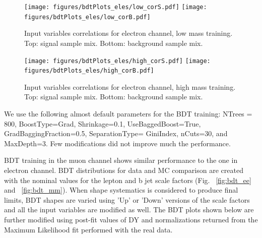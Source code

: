 \begin{figure}[tbp]
  \begin{center}
   \texttt{[image: figures/bdtPlots\_eles/low\_corS.pdf]}
   \texttt{[image: figures/bdtPlots\_eles/low\_corB.pdf]}
    \caption{ Input variables correlations for electron channel, low mass training. Top: signal sample mix. Bottom: background sample mix. }
    \label{fig:ele_cors_low}
  \end{center}
\end{figure}


\begin{figure}[tbp]
  \begin{center}
   \texttt{[image: figures/bdtPlots\_eles/high\_corS.pdf]}
   \texttt{[image: figures/bdtPlots\_eles/high\_corB.pdf]}
    \caption{ Input variables correlations for electron channel, high mass training. Top: signal sample mix. Bottom: background sample mix. }
    \label{fig:ele_cors_high}
  \end{center}
\end{figure}


We use the following almost default parameters for the BDT training:
NTrees = 800, BoostType=Grad, Shrinkage=0.1, UseBaggedBoost=True,
GradBaggingFraction=0.5, SeparationType= GiniIndex, nCuts=30, and
MaxDepth=3. Few modifications did not improve much the performance.


BDT training in the muon channel shows similar performance to the one in electron channel.
BDT distributions for data and MC comparison are created with the nominal values for the lepton and b jet scale factors (Fig. ~\ref{fig:bdt_ee} and ~\ref{fig:bdt_mm}). When shape systematics is considered to produce final limits, BDT shapes are
varied using 'Up' or 'Down' versions of the scale factors and all the input variables are modified as well. The BDT plots shown below are further modified using post-fit values of DY and \ttbar normalizations returned from the Maximum Likelihood fit performed with the real data. 






